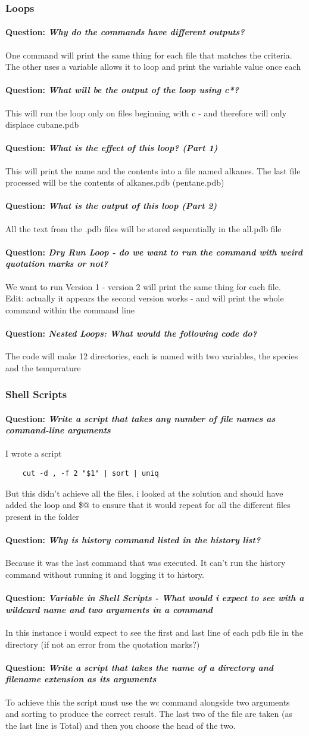 \documentclass[12pt]{article}
\newcommand{\question}[1]{\paragraph{Question: {\textnormal{\textit{#1}}} ~\\}}
\begin{document}
\subsubsection{Loops}
\question{Why do the commands have different outputs?}
One command will print the same thing for each file that matches the criteria. The other uses a variable allows it to loop and print the variable value once each

\question{What will be the output of the loop using c*?}
This will run the loop only on files beginning with c - and therefore will only displace cubane.pdb
\question{What is the effect of this loop? (Part 1)}
This will print the name and the contents into a file named alkanes. The last file processed will be the contents of alkanes.pdb (pentane.pdb)
\question{What is the output of this loop (Part 2)}
All the text from the .pdb files will be stored sequentially in the all.pdb file
\question{Dry Run Loop - do we want to run the command with weird quotation marks or not?}
We want to run Version 1 - version 2 will print the same thing for each file.\\
Edit: actually it appears the second version works - and will print the whole command within the command line
\question{Nested Loops: What would the following code do?}
The code will make 12 directories, each is named with two variables, the species and the temperature
\subsubsection{Shell Scripts}
\question{Write a script that takes any number of file names as command-line arguments}
I wrote a script 
\begin{verbatim}
    cut -d , -f 2 "$1" | sort | uniq
\end{verbatim}
But this didn't achieve all the files, i looked at the solution and should have added the loop and \$@ to ensure that it would repeat for all the different files present in the folder

\question{Why is history command listed in the history list?}
Because it was the last command that was executed. It can't run the history command without running it and logging it to history.

\question{Variable in Shell Scripts - What would i expect to see with a wildcard name and two arguments in a command}
In this instance i would expect to see the first and last line of each pdb file in the directory (if not an error from the quotation marks?)
\question{Write a script that takes the name of a directory and filename extension as its arguments}
To achieve this the script must use the wc command alongside two arguments and sorting to produce the correct result. The last two of the file are taken (as the last line is Total) and then you choose the head of the two.
\end{document}
